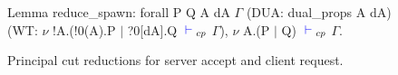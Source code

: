 \begin{figure}
\begin{coq}
Lemma reduce_spawn:
  forall P Q A dA $\Gamma$
         (DUA: dual_props A dA)
         (WT: $\nu$ !A.(!0(A).P $\mid$ ?0[dA].Q ${\color{blue} {} \vdash {}}_{cp}$ $\Gamma$),
    $\nu$ A.(P $\mid$ Q) ${\color{blue} {} \vdash {}}_{cp}$ $\Gamma$.
\end{coq}
\caption{Principal cut reductions for server accept and client request.}
\label{fig:principal}
\end{figure}
